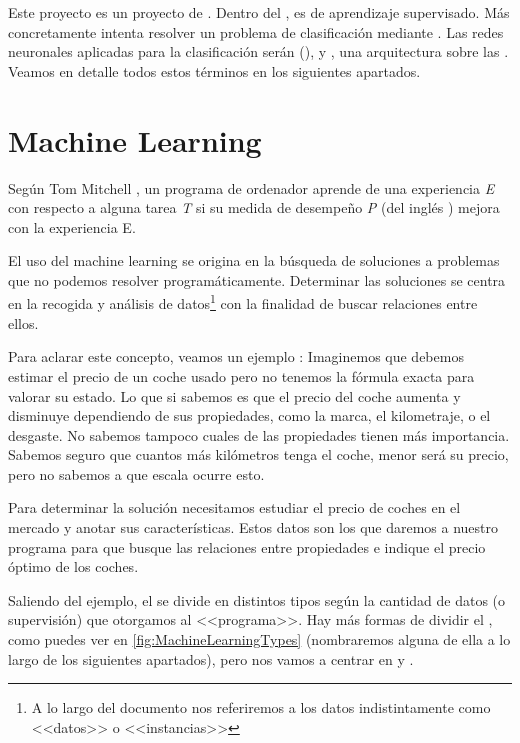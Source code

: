

Este proyecto es un proyecto de . Dentro del , es de aprendizaje supervisado. Más concretamente intenta resolver un problema de clasificación mediante . Las redes neuronales aplicadas para la clasificación serán  (), y , una arquitectura sobre las . Veamos en detalle todos estos términos en los siguientes apartados.

\section{Machine Learning}

Según Tom Mitchell , un programa de ordenador aprende de una experiencia \textit{E} con respecto a alguna tarea \textit{T} si su medida de desempeño \textit{P} (del inglés ) mejora con la experiencia E.

El uso del machine learning se origina en la búsqueda de soluciones a problemas que no podemos resolver programáticamente. Determinar las soluciones se centra en la recogida y análisis de datos\footnote{A lo largo del documento nos referiremos a los datos indistintamente como <<datos>> o <<instancias>>} con la finalidad de buscar relaciones entre ellos.

Para aclarar este concepto, veamos un ejemplo \label{example:car_price}:
Imaginemos que debemos estimar el precio de un coche usado pero no tenemos la fórmula exacta para valorar su estado. Lo que si sabemos es que el precio del coche aumenta y disminuye dependiendo de sus propiedades, como la marca, el kilometraje, o el desgaste. No sabemos tampoco cuales de las propiedades tienen más importancia. Sabemos seguro que cuantos más kilómetros tenga el coche, menor será su precio, pero no sabemos a que escala ocurre esto.

Para determinar la solución necesitamos estudiar el precio de coches en el mercado y anotar sus características. Estos datos son los que daremos a nuestro programa para que busque las relaciones entre propiedades e indique el precio óptimo de los coches.

Saliendo del ejemplo, el  se divide en distintos tipos según la cantidad de datos (o supervisión) que otorgamos al <<programa>>. Hay más formas de dividir el , como puedes ver en \ref{fig:MachineLearningTypes} (nombraremos alguna de ella a lo largo de los siguientes apartados), pero nos vamos a centrar en  y .

